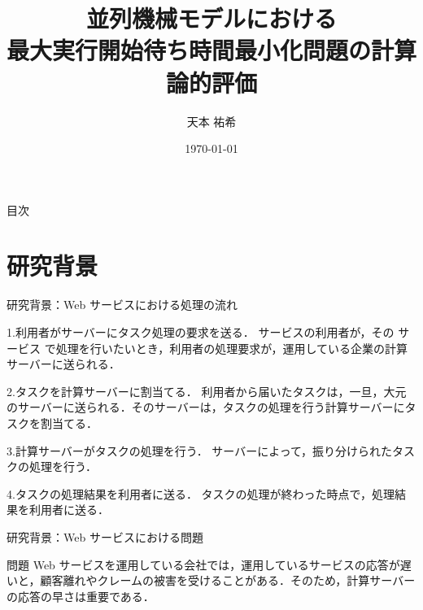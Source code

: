 \documentclass[dvipdfmx]{beamer}
\title{並列機械モデルにおける\\最大実行開始待ち時間最小化問題の計算論的評価}
\author{天本 祐希}
\institute{青山学院大学 宋研究室}
\date{\today}
\begin{document}
\begin{frame}
  \titlepage
\end{frame}

\begin{frame}{目次}
  \tableofcontents
\end{frame}
\section{研究背景}
\begin{frame}{研究背景：Web サービスにおける処理の流れ}
  \begin{block}{1.利用者がサーバーにタスク処理の要求を送る．}
    サービスの利用者が，その サービス で処理を行いたいとき，利用者の処理要求が，運用している企業の計算サーバーに送られる．
  \end{block}

  \begin{alertblock}{2.タスクを計算サーバーに割当てる．}
    利用者から届いたタスクは，一旦，大元のサーバーに送られる．そのサーバーは，タスクの処理を行う計算サーバーにタスクを割当てる．
  \end{alertblock}

  \begin{alertblock}{3.計算サーバーがタスクの処理を行う．}
    サーバーによって，振り分けられたタスクの処理を行う．
  \end{alertblock}

  \begin{block}{4.タスクの処理結果を利用者に送る．}
    タスクの処理が終わった時点で，処理結果を利用者に送る．
  \end{block}
\end{frame}

\begin{frame}{研究背景：Web サービスにおける問題}
  \begin{block}{問題}
    Web サービスを運用している会社では，運用しているサービスの応答が遅いと，顧客離れやクレームの被害を受けることがある．そのため，計算サーバーの応答の早さは重要である．
  \end{block}
\end{frame}

\end{document}
